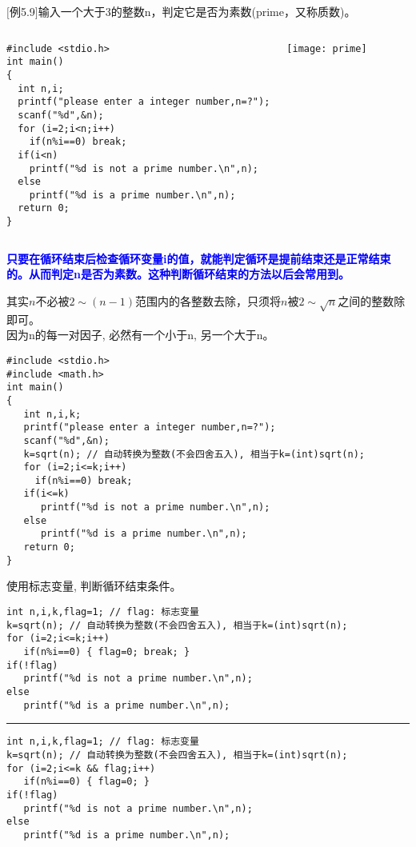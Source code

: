 \begin{frame}
\small
$[$例5.9$]$输入一个大于3的整数n，判定它是否为素数(prime，又称质数)。
\centering
\begin{columns}
\begin{lstlisting}
#include <stdio.h>
int main()
{
  int n,i;
  printf("please enter a integer number,n=?");
  scanf("%d",&n);
  for (i=2;i<n;i++)
    if(n%i==0) break;
  if(i<n) 
    printf("%d is not a prime number.\n",n);
  else 
    printf("%d is a prime number.\n",n);
  return 0;
}
\end{lstlisting}
	\texttt{[image: prime]}
\end{columns}
\textbf{\textcolor{blue}{只要在循环结束后检查循环变量i的值，就能判定循环是提前结束还是正常结束的。从而判定n是否为素数。这种判断循环结束的方法以后会常用到。}}
\end{frame}

\begin{frame}
\small
其实$n$不必被$2\sim (n-1)$范围内的各整数去除，只须将$n$被$2\sim\sqrt{n}$之间的整数除即可。\\
因为n的每一对因子, 必然有一个小于n, 另一个大于n。
\begin{lstlisting}
#include <stdio.h>
#include <math.h>
int main()
{
   int n,i,k;
   printf("please enter a integer number,n=?");
   scanf("%d",&n);
   k=sqrt(n); // 自动转换为整数(不会四舍五入), 相当于k=(int)sqrt(n);
   for (i=2;i<=k;i++)
     if(n%i==0) break;
   if(i<=k) 
      printf("%d is not a prime number.\n",n);
   else 
      printf("%d is a prime number.\n",n);
   return 0;
}
\end{lstlisting}
\end{frame}

\begin{frame}
\small
使用标志变量, 判断循环结束条件。
\begin{lstlisting}
int n,i,k,flag=1; // flag: 标志变量
k=sqrt(n); // 自动转换为整数(不会四舍五入), 相当于k=(int)sqrt(n);
for (i=2;i<=k;i++)
   if(n%i==0) { flag=0; break; }
if(!flag) 
   printf("%d is not a prime number.\n",n);
else 
   printf("%d is a prime number.\n",n);
\end{lstlisting}
\pause
\rule{\textwidth}{1pt} %
\begin{lstlisting}
int n,i,k,flag=1; // flag: 标志变量
k=sqrt(n); // 自动转换为整数(不会四舍五入), 相当于k=(int)sqrt(n);
for (i=2;i<=k && flag;i++)
   if(n%i==0) { flag=0; }
if(!flag) 
   printf("%d is not a prime number.\n",n);
else 
   printf("%d is a prime number.\n",n);
\end{lstlisting}
\end{frame}

